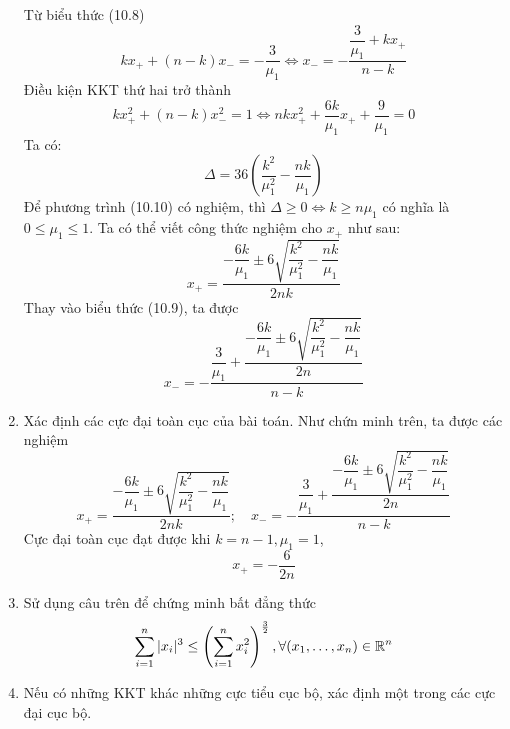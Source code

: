 \begin{solution}
\begin{enumerate}[label=(\alph*)]
\begin{equation}
        \end{equation}
        Từ biểu thức (10.8)
        \begin{equation}
            kx_{+}+(n-k)x_{-} = -\dfrac{3}{\mu_1} \Leftrightarrow x_{-} = -\dfrac{\dfrac{3}{\mu_1}+kx_{+}}{n-k}
        \end{equation}
        Điều kiện KKT thứ hai trở thành
        \begin{equation}
            kx_{+}^2 + (n-k)x_{-}^2 = 1 \Leftrightarrow nkx_{+}^2 +\dfrac{6k}{\mu_1}x_{+} + \dfrac{9}{\mu_1} = 0
        \end{equation}
        Ta có:
        \begin{equation}
            \Delta = 36\left(\dfrac{k^2}{\mu_1^2}-\dfrac{nk}{\mu_1}\right)
        \end{equation}
        Để phương trình (10.10) có nghiệm, thì $\Delta \geq 0 \Leftrightarrow k \geq n\mu_1$ có nghĩa là $0\leq \mu_1 \leq 1$. Ta có thể viết công thức nghiệm cho $x_{+}$ như sau:
        \begin{equation}
            x_{+} = \dfrac{-\dfrac{6k}{\mu_1}\pm 6\sqrt{\dfrac{k^2}{\mu_1^2}-\dfrac{nk}{\mu_1}}}{2nk}
        \end{equation}
        Thay vào biểu thức (10.9), ta được
        \begin{equation}
            x_{-} = -\dfrac{\dfrac{3}{\mu_1} + \dfrac{-\dfrac{6k}{\mu_1}\pm 6\sqrt{\dfrac{k^2}{\mu_1^2}-\dfrac{nk}{\mu_1}}}{2n}}{n-k}
        \end{equation}
        \item Xác định các cực đại toàn cục của bài toán. Như chứn minh trên, ta được các nghiệm
        \begin{equation}
            x_{+} = \dfrac{-\dfrac{6k}{\mu_1}\pm 6\sqrt{\dfrac{k^2}{\mu_1^2}-\dfrac{nk}{\mu_1}}}{2nk};\quad x_{-} = -\dfrac{\dfrac{3}{\mu_1} + \dfrac{-\dfrac{6k}{\mu_1}\pm 6\sqrt{\dfrac{k^2}{\mu_1^2}-\dfrac{nk}{\mu_1}}}{2n}}{n-k}
        \end{equation}
        Cực đại toàn cục đạt được khi $k=n-1, \mu_1 = 1$, 
        \begin{equation}
            x_{+} = -\dfrac{6}{2n}
        \end{equation}
        \item Sử dụng câu trên để chứng minh bất đẳng thức
        \begin{equation}
            \sum_{i=1}^n| x_i|^3 \leq \left(\sum_{i=1}^nx_i^2\right)^{\frac{3}{2}}, \forall (x_1, \dots, x_n) \in \mathbb{R}^n
        \end{equation}
        \item Nếu có những KKT khác những cực tiểu cục bộ, xác định một trong các cực đại cục bộ.
    \end{enumerate}
\end{solution}
